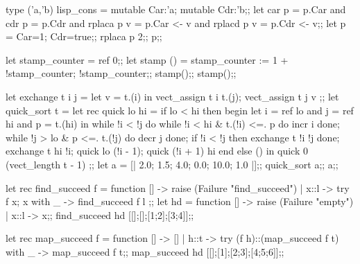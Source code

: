 \begin{caml_example}
type ('a,'b) lisp_cons = {mutable Car:'a; mutable Cdr:'b};;
let car p = p.Car
and cdr p = p.Cdr
and rplaca p v = p.Car <- v
and rplacd p v = p.Cdr <- v;;
let p = {Car=1; Cdr=true};;
rplaca p 2;;
p;;
\end{caml_example}

\begin{caml_example}
let stamp_counter = ref 0;;
let stamp () =
  stamp_counter := 1 + !stamp_counter; !stamp_counter;;
stamp();;
stamp();;
\end{caml_example}

\begin{caml_example}
let exchange t i j =
  let v = t.(i) in vect_assign t i t.(j); vect_assign t j v
;;
let quick_sort t =
  let rec quick lo hi =
    if lo < hi
    then begin
          let i = ref lo
          and j = ref hi
          and p = t.(hi) in
          while !i < !j
           do
            while !i < hi & t.(!i) <=. p do incr i done;
            while !j > lo & p <=. t.(!j) do decr j done;
            if !i < !j then exchange t !i !j
           done;
          exchange t hi !i;
          quick lo (!i - 1);
          quick (!i + 1) hi
         end
     else ()
  in quick 0 (vect_length t - 1)
;;
let a = [| 2.0; 1.5; 4.0; 0.0; 10.0; 1.0 |];;
quick_sort a;;
a;;
\end{caml_example}

\begin{caml_example}
let rec find_succeed f = function
      [] -> raise (Failure "find_succeed")
    | x::l -> try f x; x with _ -> find_succeed f l
;;
let hd = function [] -> raise (Failure "empty") | x::l -> x;;
find_succeed hd [[];[];[1;2];[3;4]];;
\end{caml_example}

\begin{caml_example}
let rec map_succeed f = function
      [] -> []
    | h::t -> try (f h)::(map_succeed f t) 
              with _ ->  map_succeed f t;;
map_succeed hd [[];[1];[2;3];[4;5;6]];;
\end{caml_example}

